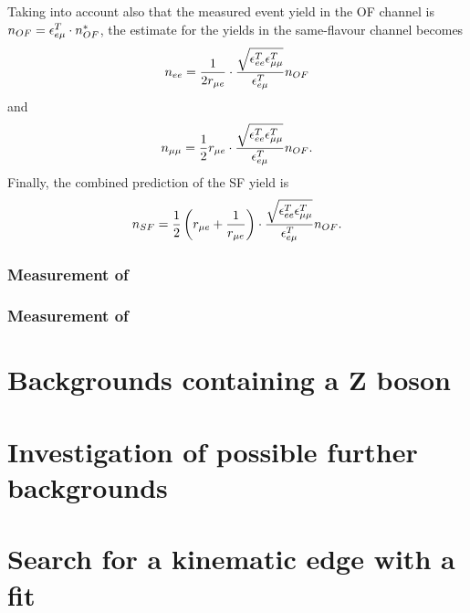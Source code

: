 Taking into account also that the measured event yield in the OF channel is $n_{OF} = \epsilon_{e\mu}^T \cdot n_{OF}^{*}$, the estimate for the yields in the same-flavour channel becomes
\begin{equation}
n_{ee} = \frac{1}{2r_{\mu e}} \cdot \frac{\sqrt{\epsilon_{ee}^T \epsilon_{\mu\mu}^T}}{\epsilon_{e\mu}^T} n_{OF}
\end{equation} 
and
\begin{equation}
n_{\mu\mu} = \frac{1}{2}r_{\mu e}  \cdot \frac{\sqrt{\epsilon_{ee}^T \epsilon_{\mu\mu}^T}}{\epsilon_{e\mu}^T} n_{OF}.
\end{equation} 
Finally, the combined prediction of the SF yield is
\begin{equation}
n_{SF} = \frac{1}{2}\left(r_{\mu e} + \frac{1}{r_{\mu e}}\right) \cdot \frac{\sqrt{\epsilon_{ee}^T \epsilon_{\mu\mu}^T}}{\epsilon_{e\mu}^T}  n_{OF}.
\end{equation}
\subsubsection{Measurement of \rmue}
\label{sec:rmue}
\subsubsection{Measurement of \RT}

\section{Backgrounds containing a Z boson}
\section{Investigation of possible further backgrounds}
\section{Search for a kinematic edge with a fit}

